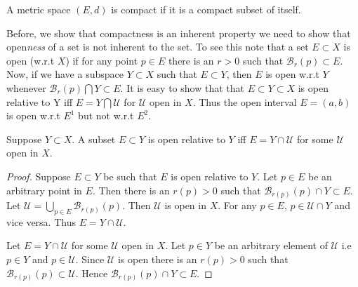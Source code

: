 \begin{Definition}
    A metric space $(E,d)$ is compact if it is a compact subset of itself.
\end{Definition}
Before, we show that compactness is an inherent property we need to show that open\emph{ness} of a
set is not inherent to the set. To see this note that a set $E \subset X$ is open (w.r.t $X$) if
for any point $p \in E$ there is an $r > 0$ such that $\mathcal{B}_r(p) \subset E$. Now, if we have
a subspace $Y \subset X$ such that $E \subset Y$, then $E$ is open w.r.t $Y$ whenever $
\mathcal{B}_r(p) \bigcap Y \subset E$. It is easy to show that that $ E \subset Y \subset X$ is open
relative to Y iff $E = Y \bigcap \mathcal{U}$ for $\mathcal{U}$ open in $X$. Thus the open interval
$E = (a,b)$ is open w.r.t $E^1$ but not w.r.t $E^2$.


\begin{Theorem}[name=relative open sets]
    Suppose $Y \subset X$. A subset $E \subset Y$ is open relative to $Y$ iff $E  = Y \cap
    \mathcal{U}$ for some $\mathcal{U}$ open in $X$.
\end{Theorem}
\begin{proof}
    Suppose $E \subset Y$ be such that $E$ is open relative to $Y$. Let $p \in E$ be an arbitrary
    point in $E$. Then there is an $r(p) > 0$ such that $\mathcal{B}_{r(p)}(p) \cap Y \subset E$.
    Let $\mathcal{U} = \bigcup_{p \in E} \mathcal{B}_{r(p)}(p)$. Then $\mathcal{U}$ is open in $X$.
    For any $p \in E$, $p \in \mathcal{U} \cap Y$ and vice versa. Thus $E = Y \cap \mathcal{U}$.

    Let $E = Y \cap \mathcal{U}$ for some $\mathcal{U}$ open in $X$. Let $p \in Y$ be an arbitrary 
    element of $\mathcal{U}$ i.e $p \in Y$ and $p \in \mathcal{U}$. 
    Since $\mathcal{U}$ is open there is an $r(p) >
    0$ such that $\mathcal{B}_{r(p)}(p) \subset \mathcal{U}$. Hence 
    $\mathcal{B}_{r(p)}(p) \cap Y \subset E$.
\end{proof}


